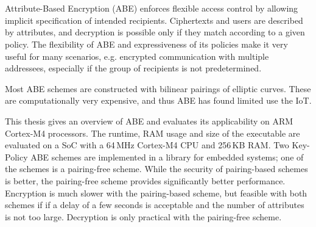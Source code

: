 \chapter{\abstractname}


Attribute-Based Encryption (ABE) enforces flexible access control by allowing implicit specification of intended recipients.
Ciphertexts and users are described by attributes, and decryption is possible only if they match according to a given policy.
The flexibility of ABE and expressiveness of its policies make it very useful for many scenarios, e.g. encrypted communication with multiple addressees, especially if the group of recipients is not predetermined.

Most ABE schemes are constructed with bilinear pairings of elliptic curves.
These are computationally very expensive, and thus ABE has found limited use the IoT.

This thesis gives an overview of ABE and evaluates its applicability on ARM Cortex-M4 processors.
The runtime, RAM usage and size of the executable are evaluated on a SoC with a 64\,MHz Cortex-M4 CPU and 256\,KB RAM.
Two Key-Policy ABE schemes are implemented in a library for embedded systems; one of the schemes is a pairing-free scheme.
While the security of pairing-based schemes is better, the pairing-free scheme provides significantly better performance.
Encryption is much slower with the pairing-based scheme, but feasible with both schemes if if a delay of a few seconds is acceptable and the number of attributes is not too large.
Decryption is only practical with the pairing-free scheme.